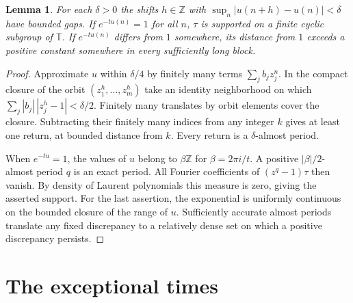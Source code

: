 \documentclass[11pt]{article}
\newtheorem{lemma}[theorem]{Lemma}
\newcommand{\T}{\mathbb T}
\newcommand{\Z}{\mathbb Z}
\begin{document}
\begin{lemma}\label{per}
For each $\delta>0$ the shifts $h\in\Z$ with
$\sup_n|u(n+h)-u(n)|<\delta$ have bounded gaps. If $e^{-tu(n)}=1$
for all $n$, $\tau$ is supported on a finite cyclic subgroup of $\T$.
If $e^{-tu(n)}$ differs from $1$ somewhere, its distance from $1$ exceeds
a positive constant somewhere in every sufficiently long block.
\end{lemma}
\begin{proof}
Approximate $u$ within $\delta/4$ by finitely many terms $\sum_j b_jz_j^n$.
In the compact closure of the orbit $(z_1^h,\ldots,z_m^h)$ take an identity
neighborhood on which $\sum_j|b_j|\,|z_j^h-1|<\delta/2$.
Finitely many translates by orbit elements cover the closure. Subtracting
their finitely many indices from any integer $k$ gives at least one
return, at bounded distance from $k$. Every return is a $\delta$-almost period.

When $e^{-tu}=1$, the values of $u$ belong to $\beta\Z$ for
$\beta=2\pi i/t$. A positive $|\beta|/2$-almost period $q$ is an exact
period. All Fourier coefficients of $(z^q-1)\tau$ then vanish. By density
of Laurent polynomials this measure is zero, giving the asserted support.
For the last assertion, the exponential is uniformly continuous on the
bounded closure of the range of $u$. Sufficiently accurate almost periods
translate any fixed discrepancy to a relatively dense set on which a
positive discrepancy persists.
\end{proof}

\section{The exceptional times}
\end{document}

